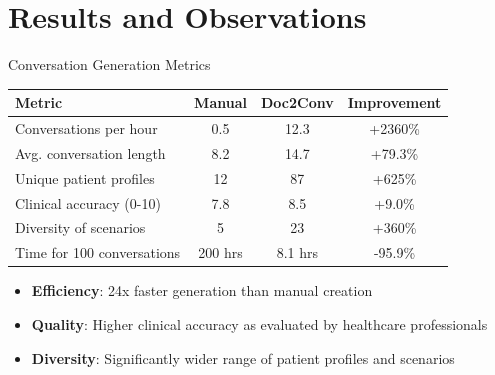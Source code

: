 \section{Results and Observations}

\begin{frame}{Conversation Generation Metrics}
  \begin{table}
    \centering
    \footnotesize
    \begin{tabular}{|l|c|c|c|}
      \hline
      \textbf{Metric} & \textbf{Manual} & \textbf{Doc2Conv} & \textbf{Improvement} \\
      \hline
      Conversations per hour & 0.5 & 12.3 & +2360\% \\
      Avg. conversation length & 8.2 & 14.7 & +79.3\% \\
      Unique patient profiles & 12 & 87 & +625\% \\
      Clinical accuracy (0-10) & 7.8 & 8.5 & +9.0\% \\
      Diversity of scenarios & 5 & 23 & +360\% \\
      Time for 100 conversations & 200 hrs & 8.1 hrs & -95.9\% \\
      \hline
    \end{tabular}
  \end{table}

  \begin{itemize}
    \item \textbf{Efficiency}: 24x faster generation than manual creation
    \item \textbf{Quality}: Higher clinical accuracy as evaluated by healthcare professionals
    \item \textbf{Diversity}: Significantly wider range of patient profiles and scenarios
  \end{itemize}
\end{frame}

